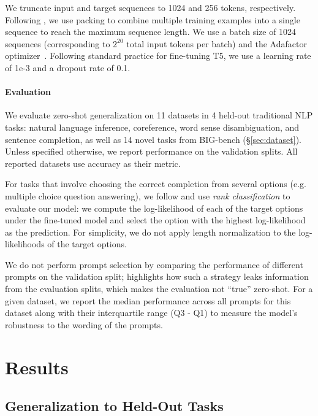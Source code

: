 We truncate input and target sequences to 1024 and 256 tokens, respectively. Following \citet{t5}, we use packing to combine multiple training examples into a single sequence to reach the maximum sequence length. We use a batch size of 1024 sequences (corresponding to $2^{20}$ total input tokens per batch) and the Adafactor optimizer~\citep{shazeer2018adafactor}. Following standard practice for fine-tuning T5, we use a learning rate of 1e-3 and a dropout rate of 0.1.

\paragraph{Evaluation}

We evaluate zero-shot generalization on 11 datasets in 4 held-out traditional NLP tasks: natural language inference, coreference, word sense disambiguation, and sentence completion, as well as 14 novel tasks from BIG-bench (\S\ref{sec:dataset}). Unless specified otherwise, we report performance on the validation splits. All reported datasets use accuracy as their metric.

For tasks that involve choosing the correct completion from several options (e.g. multiple choice question answering), we follow \cite{gpt3} and use \textit{rank classification} to evaluate our model: we compute the log-likelihood of each of the target options under the fine-tuned model and select the option with the highest log-likelihood as the prediction. For simplicity, we do not apply length normalization to the log-likelihoods of the target options.

We do not perform prompt selection by comparing the performance of different prompts on the validation split; \cite{true-zero-shot} highlights how such a strategy leaks information from the evaluation splits, which makes the evaluation not ``true'' zero-shot. For a given dataset, we report the median performance across all prompts for this dataset along with their interquartile range (Q3 - Q1) to measure the model's robustness to the wording of the prompts.

\section{Results}

\subsection{Generalization to Held-Out Tasks} \label{sec:gen-new-tasks}

